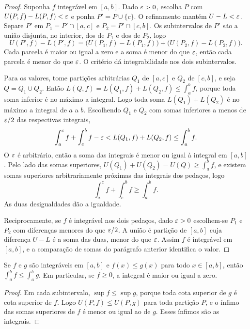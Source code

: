 \documentclass[11pt,a4paper]{article}
\begin{document}
\begin{proof}
Suponha $f$ integrável em $[a,b]$. Dado $\varepsilon>0$, escolha $P$ com $U(P,f)-L(P,f)<\varepsilon$ e ponha $P'=P\cup\{c\}$. O refinamento mantém $U-L<\varepsilon$. Separe $P'$ em $P_1=P'\cap[a,c]$ e $P_2=P'\cap[c,b]$. Os subintervalos de $P'$ são a união disjunta, no interior, dos de $P_1$ e dos de $P_2$, logo
\[
U(P',f)-L(P',f)=\bigl(U(P_1,f)-L(P_1,f)\bigr)+\bigl(U(P_2,f)-L(P_2,f)\bigr).
\]
Cada parcela é maior ou igual a zero e a soma é menor do que $\varepsilon$, então cada parcela é menor do que $\varepsilon$. O critério dá integrabilidade nos dois subintervalos.

Para os valores, tome partições arbitrárias $Q_1$ de $[a,c]$ e $Q_2$ de $[c,b]$, e seja $Q=Q_1\cup Q_2$. Então $L(Q,f)=L(Q_1,f)+L(Q_2,f)\le\int_a^b f$, porque toda soma inferior é no máximo a integral. Logo toda soma $L(Q_1)+L(Q_2)$ é no máximo a integral de $a$ a $b$. Escolhendo $Q_1$ e $Q_2$ com somas inferiores a menos de $\varepsilon/2$ das respectivas integrais,
\[
\int_a^c f+\int_c^b f-\varepsilon<L(Q_1,f)+L(Q_2,f)\le\int_a^b f.
\]
O $\varepsilon$ é arbitrário, então a soma das integrais é menor ou igual à integral em $[a,b]$. Pelo lado das somas superiores, $U(Q_1)+U(Q_2)=U(Q)\ge\int_a^b f$, e existem somas superiores arbitrariamente próximas das integrais dos pedaços, logo
\[
\int_a^c f+\int_c^b f\ge\int_a^b f.
\]
As duas desigualdades dão a igualdade.

Reciprocamente, se $f$ é integrável nos dois pedaços, dado $\varepsilon>0$ escolhem-se $P_1$ e $P_2$ com diferenças menores do que $\varepsilon/2$. A união é partição de $[a,b]$ cuja diferença $U-L$ é a soma das duas, menor do que $\varepsilon$. Assim $f$ é integrável em $[a,b]$, e a comparação de somas do parágrafo anterior identifica o valor.
\end{proof}

\begin{teorema}[Comparação]\label{teo:comparacao}
Se $f$ e $g$ são integráveis em $[a,b]$ e $f(x)\le g(x)$ para todo $x\in[a,b]$, então $\int_a^b f\le\int_a^b g$. Em particular, se $f\ge 0$, a integral é maior ou igual a zero.
\end{teorema}

\begin{proof}
Em cada subintervalo, $\sup f\le\sup g$, porque toda cota superior de $g$ é cota superior de $f$. Logo $U(P,f)\le U(P,g)$ para toda partição $P$, e o ínfimo das somas superiores de $f$ é menor ou igual ao de $g$. Esses ínfimos são as integrais.
\end{proof}
\end{document}
